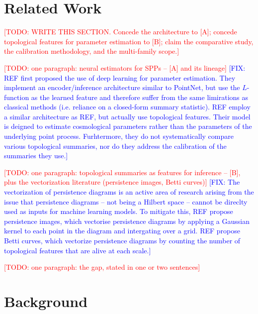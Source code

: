 \documentclass[11pt,letterpaper]{article}
\newcommand{\1}{\mathds{1}}
\newcommand{\todo}[1]{\textcolor{red}{[TODO: #1]}}
\newcommand{\fix}[1]{\textcolor{blue}{[FIX: #1]}}
\newcommand{\todo}[1]{}\newcommand{\fix}[1]{}
\theoremstyle{plain}
\theoremstyle{definitioncolon}
\begin{document}

\section{Related Work}
\label{sec:related}

\todo{WRITE THIS SECTION. Concede the architecture to [A]; concede topological
features for parameter estimation to [B]; claim the comparative study, the
calibration methodology, and the multi-family scope.}

\todo{one paragraph: neural estimators for SPPs -- [A] and its lineage}
\fix{REF first proposed the use of deep learning for parameter estimation. They implement
an encoder/inference architecture similar to PointNet, but use the $L$-function as the learned
feature and therefore suffer from the same limirations as classical methods (i.e. reliance
on a closed-form summary statistic). REF employ a similar architecture as REF, but actually use
topological features. Their model is deigned to estimate cosmological parameters rather than the
parameters of the underlying point process. Furhtermore, they do not systematically compare 
various topological summaries, nor do they address the calibration of the summaries they use.}

\todo{one paragraph: topological summaries as features for inference -- [B],
plus the vectorization literature (persistence images, Betti curves)}
\fix{The vectorization of persistence diagrams is an active area of research arising from the issue
that persistence diagrams -- not being a Hilbert space -- cannot be direclty used as inputs for
machine learning models. To mitigate this, REF propose persistence images, which vectorise persistence
diagrams by applying a Gaussian kernel to each point in the diagram and intergating over a grid.
REF propose Betti curves, which vectorize persistence diagrams by counting the number of topological features
that are alive at each scale.}

\todo{one paragraph: the gap, stated in one or two sentences}



\section{Background}
\label{sec:background}
\end{document}
